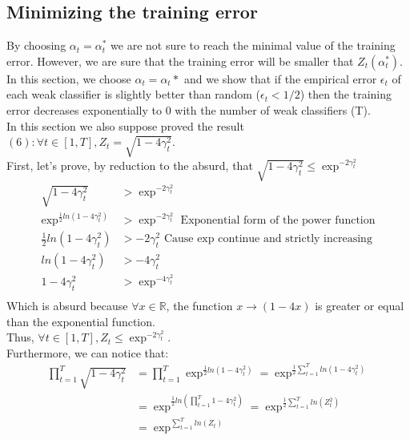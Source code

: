 \documentclass[12pt]{article}											%
\begin{document}
\subsection{Minimizing the training error}
By choosing $\alpha_t = \alpha_t^*$ we are not sure to reach the minimal value of the training error.   However, we are sure that the training error will be smaller that $Z_t(\alpha_t^*)$.   In this section, we choose $\alpha_t = \alpha_t*$ and we show that if the empirical error $\epsilon_t$ of each weak classifier is slightly better than random ($\epsilon_t < 1/2$)  then the training error decreases exponentially to 0 with the number of weak classifiers (T).\\
In this section we also suppose proved the result $(6): \forall t \in [1, T], Z_t = \sqrt{1 - 4 \gamma_t^2}$.\\
First, let's prove, by reduction to the absurd, that $\sqrt{1 - 4 \gamma_t^2} \leq \exp^{-2 \gamma_t ^2}$
	\begin{equation}
	\begin{aligned}
		\sqrt{1 - 4 \gamma_t^2}										 & > \exp^{-2 \gamma_t ^2}\\
		\exp^{\frac{1}{2}ln(1 - 4 \gamma_t^2)}		& > \exp^{-2 \gamma_t ^2} 	 \mbox{ Exponential form of the power function}\\
		\frac{1}{2}ln(1 - 4 \gamma_t^2)						 & > -2 \gamma_t ^2 					\mbox{ Cause exp continue and strictly increasing}\\
		ln(1 - 4 \gamma_t^2)						 					& > -4 \gamma_t ^2\\
		1 - 4 \gamma_t^2								 					& > \exp^{-4 \gamma_t ^2}\\
     \label{equation:maxZt}
	\end{aligned}
	\end{equation}
Which is absurd because $\forall x \in \mathbb{R}$, the function $x\rightarrow (1-4x)$ is greater or equal than the exponential function.\\
Thus, $\forall t \in [1, T], Z_t   \leq \exp^{-2 \gamma_t ^2}$.\\
Furthermore, we can notice that:
\begin{equation*}
	\begin{aligned}
		\prod_{t=1}^{T}{\sqrt{1 - 4 \gamma_t ^2}}	&= \prod_{t=1}^{T}{\exp^{\frac{1}{2} ln(1 - 4 \gamma_t ^ 2)    }        }  = \exp^{\frac{1}{2} \sum_{t=1}^{T}{ln(1-4 \gamma_t ^2)}  }  \\
    																									&= \exp^{\frac{1}{2} ln(\prod_{t=1}^{T}{1-4\gamma_t ^2} )  }   =  \exp^{\frac{1}{2} \sum_{t=1}^{T}{ln(Z_t ^2)} }  \\
                                                                                                        &= \exp^{\sum_{t=1}^{T}{ln(Z_t)} }\\
	\end{aligned}
    \end{equation*}
\end{document}
